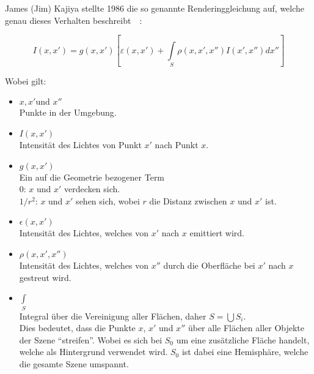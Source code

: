 James (Jim) Kajiya stellte 1986 die so genannte Renderinggleichung auf,
welche genau dieses Verhalten
beschreibt~\parencite{kajiya_rendering_1986}~\parencite{foley_computer_1996}:

\begin{equation}
    I(x, x') = g(x, x')[\varepsilon(x, x') + \int\limits_{S}\rho(x, x', x'')I(x', x'')dx'']
\end{equation}

Wobei gilt:

\begin{itemize}
    \item $x, x' \text{und } x''$\\
        Punkte in der Umgebung.
    \item $ I(x, x')$\\
        Intensität des Lichtes von Punkt $x'$ nach Punkt $x$.
    \item $ g(x, x')$\\
        Ein auf die Geometrie bezogener Term\\
        \hspace*{4mm} $0$:     \hspace*{6mm} $x$ und $x'$ verdecken
                               sich.\\
        \hspace*{4mm} $1/r^2$: \hspace*{1mm} $x$ und $x'$ sehen sich,
                               wobei $r$ die Distanz zwischen $x$ und
                               $x'$ ist.
    \item $\epsilon(x, x')$\\
        Intensität des Lichtes, welches von $x'$ nach $x$ emittiert
        wird.
    \item $\rho(x, x', x'')$\\
        Intensität des Lichtes, welches von $x''$
        durch die Oberfläche bei $x'$ nach $x$
        gestreut wird.
    \item $\int\limits_{S}$\\
        Integral über die Vereinigung aller Flächen, daher $ S =
        \bigcup{S_{i}} $.\\ Dies bedeutet, dass die Punkte $x$, $x'$ und
        $x''$ über alle Flächen aller Objekte der Szene ``streifen''.
        Wobei es sich bei $S_{0}$ um eine zusätzliche Fläche handelt,
        welche als Hintergrund verwendet wird.  $S_{0}$ ist dabei eine
        Hemisphäre, welche die gesamte Szene umspannt.
\end{itemize}
